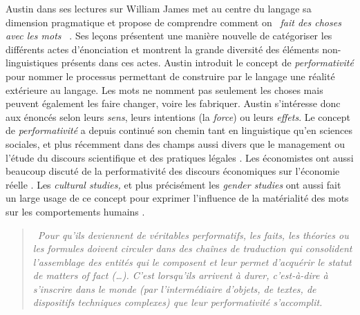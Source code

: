 Austin dans ses lectures sur William James met au centre du langage sa dimension pragmatique et propose de comprendre comment on \textit{{\guillemotleft}~fait des choses avec les mots~{\guillemotright}} \citep{Austin1975}. Ses le\c{c}ons présentent une manière nouvelle de catégoriser les différents actes d{\textquoteright}énonciation et montrent la grande diversité des éléments non-linguistiques présents dans ces actes. Austin introduit le concept de \textit{performativité} pour nommer le processus permettant de construire par le langage une réalité extérieure au langage. Les mots ne nomment pas seulement les choses mais peuvent également les faire changer, voire les fabriquer. Austin s{\textquoteright}intéresse donc aux énoncés selon leurs \textit{sens}, leurs intentions (la \textit{force}) ou leurs \textit{effets}. Le concept de \textit{performativité }a depuis continué son chemin tant en linguistique qu{\textquoteright}en sciences sociales, et plus récemment dans des champs aussi divers que le management ou l{\textquoteright}étude du discours scientifique et des pratiques légales \citep{Denis2006}. Les économistes ont aussi beaucoup discuté de la performativité des discours économiques sur l{\textquoteright}économie réelle \citep{Mackenzie2006}. Les \textit{cultural studies,} et plus précisément les \textit{gender studies }ont aussi fait un large usage de ce concept pour exprimer l{\textquoteright}influence de la matérialité des mots sur les comportements humains \citep{Butler1993}.  

\begin{quote}
    {\guillemotleft}~\textit{Pour qu{\textquoteright}ils deviennent de {\guillemotleft} véritables {\guillemotright} performatifs, les faits, les théories ou les formules doivent circuler dans des cha\^ines de traduction qui consolident l{\textquoteright}assemblage des entités qui le composent et leur permet d{\textquoteright}acquérir le statut de {\guillemotleft} matters of fact {\guillemotright} ({\dots}). C{\textquoteright}est lorsqu{\textquoteright}ils arrivent à durer, c{\textquoteright}est-à-dire à s{\textquoteright}inscrire dans le monde (par l{\textquoteright}intermédiaire d{\textquoteright}objets, de textes, de dispositifs techniques complexes) que leur performativité s{\textquoteright}accomplit.}~{\guillemotright} \citep{Denis2006}
\end{quote}

